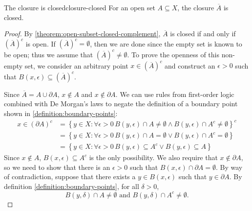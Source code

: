 \documentclass{article}
\numberwithin{equation}{section}
\numberwithin{figure}{section}
\begin{document}
\begin{theorem}{The closure is closed}{closure-closed}
    For an open set $ A \subseteq X $, the closure $ \overline{A} $ is closed.
    \begin{proof}
        By \cref{theorem:open-subset-closed-complement}, $ \overline{A} $ is
        closed if and only if $ \left(\overline{A}\right)^c $ is open. If $
        \left(\overline{A}\right)^c = \emptyset $, then we are done since the
        empty set is known to be open; thus we assume that $
        \left(\overline{A}\right)^c \neq \emptyset $. To prove the openness of
        this non-empty set, we consider an arbitrary point $ x \in
        \left(\overline{A}\right)^c $ and construct an $ \epsilon > 0 $ such
        that $ B(x, \epsilon) \subseteq \left(\overline{A}\right)^c $.

        Since $ \overline{A} = A \cup \partial A $, $ x \not\in A $ and $ x
        \not\in \partial A $. We can use rules from first-order logic combined
        with De Morgan's laws to negate the definition of a boundary point shown
        in \cref{definition:boundary-points}:
        \begin{align}
            x \in \left(\partial A\right)^c &= \left\{ y \in X \colon \forall
                \epsilon > 0 \, B(y, \epsilon) \cap A \neq \emptyset \land B(y,
                \epsilon) \cap A^c \neq \emptyset \right\}^c \\
            &= \left\{ y \in X \colon \forall \epsilon > 0 \, B(y, \epsilon)
                \cap A = \emptyset \lor B(y, \epsilon) \cap A^c = \emptyset
                \right\} \\
            &= \left\{ y \in X \colon \forall \epsilon > 0 \, B(y, \epsilon)
                \subseteq A^c \lor B(y, \epsilon) \subseteq A \right\}
        \end{align}
        Since $ x \not\in A $, $ B(x, \epsilon) \subseteq A^c $ is the only
        possibility. We also require that $ x \not\in \partial A $, so we need
        to show that there is an $ \epsilon > 0 $ such that $ B(x, \epsilon)
        \cap \partial A = \emptyset $. By way of contradiction, suppose that
        there exists a $ y \in B(x, \epsilon) $ such that $ y \in \partial A $.
        By definition \cref{definition:boundary-points}, for all $ \delta > 0 $,
        \begin{equation}
            B(y, \delta) \cap A \neq \emptyset \text{ and } B(y, \delta) \cap
            A^c \neq \emptyset.
        \end{equation}

\end{proof}
\end{theorem}
\end{document}
